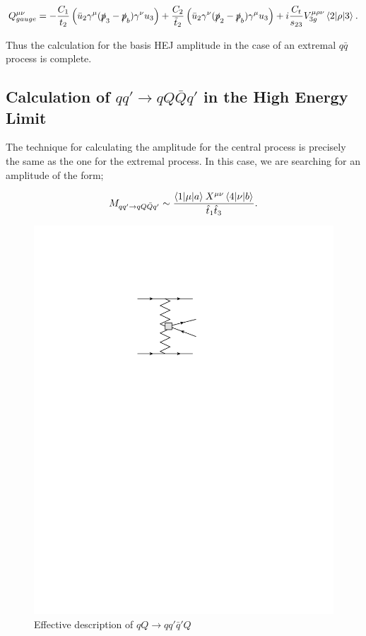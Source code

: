 \begin{equation}
Q^{\mu \nu}_{gauge} = -\frac{C_1}{t_2} \left(\bar{u}_2 \gamma^\mu (\slashed{p}_3-\slashed{p}_b)\gamma^\nu u_3 \right) + \frac{C_2}{\tilde{t}_2} \left( \bar{u}_2 \gamma^\nu (\slashed{p}_2-\slashed{p}_b) \gamma^\mu u_3 \right) + i  \frac{C_t}{s_{23}} V^{\mu \rho \nu}_{3g}  \mathinner{\langle2\vert\rho\vert3\rangle}_{}.
\end{equation}

Thus the calculation for the basis HEJ amplitude in the case of an extremal $q \bar{q}$ process is complete. 

\subsection{Calculation of $qq' \to qQ\bar{Q}q'$ in the High Energy Limit}

The technique for calculating the amplitude for the central process is precisely the same as the one for the extremal process. In this case, we are searching for an amplitude of the form;

\begin{equation}
M_{qq' \to qQ\bar{Q}q'} \sim \frac{\mathinner{\langle1\vert\mu\vert a\rangle}_{}X^{\mu \nu} \mathinner{\langle4\vert\nu\vert b\rangle}_{}}{\hat{t}_1 \hat{t}_3}.
\end{equation}

\begin{figure}[t]
\centering
\includegraphics{Images/qq_qqqq_eff.pdf}
\caption{Effective description of $qQ \to qq'\bar{q}' Q$}
\end{figure}

